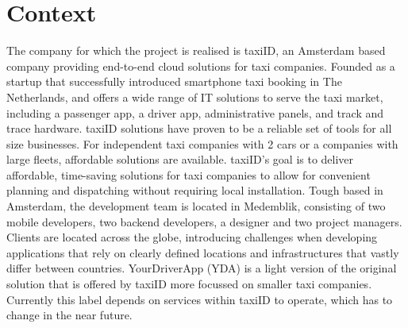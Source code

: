 \section{Context}
The company for which the project is realised is taxiID, an Amsterdam based company providing end-to-end cloud solutions for taxi companies. Founded as a startup that successfully introduced smartphone taxi booking in The Netherlands, and offers a wide range of IT solutions to serve the taxi market, including a passenger app, a driver app, administrative panels, and track and trace hardware. taxiID solutions have proven to be a reliable set of tools for all size businesses. For independent taxi companies with 2 cars or a companies with large fleets, affordable solutions are available. taxiID's goal is to deliver affordable, time-saving solutions for taxi companies to allow for convenient planning and dispatching without requiring local installation. Tough based in Amsterdam, the development team is located in Medemblik, consisting of two mobile developers, two backend developers, a designer and two project managers. Clients are located across the globe, introducing challenges when developing applications that rely on clearly defined locations and infrastructures that vastly differ between countries. YourDriverApp (YDA) is a light version of the original solution that is offered by taxiID more focussed on smaller taxi companies. Currently this label depends on services within taxiID to operate, which has to change in the near future.

%
